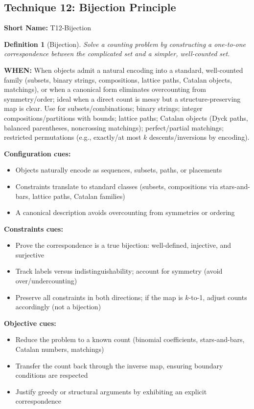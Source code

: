 \documentclass[12pt]{article}
\newtheorem{definition}{Definition}[section]
\begin{document}
\subsection{Technique 12: Bijection Principle}
\textbf{Short Name:} T12-Bijection

\begin{definition}[Bijection]
Solve a counting problem by constructing a one-to-one correspondence between the complicated set and a simpler, well-counted set.
\end{definition}

\textbf{WHEN:} When objects admit a natural encoding into a standard, well-counted family (subsets, binary strings, compositions, lattice paths, Catalan objects, matchings), or when a canonical form eliminates overcounting from symmetry/order; ideal when a direct count is messy but a structure-preserving map is clear. Use for subsets/combinations; binary strings; integer compositions/partitions with bounds; lattice paths; Catalan objects (Dyck paths, balanced parentheses, noncrossing matchings); perfect/partial matchings; restricted permutations (e.g., exactly/at most $k$ descents/inversions by encoding).

\textbf{Configuration cues:}
\begin{itemize}
    \item Objects naturally encode as sequences, subsets, paths, or placements
    \item Constraints translate to standard classes (subsets, compositions via stars-and-bars, lattice paths, Catalan families)
    \item A canonical description avoids overcounting from symmetries or ordering
\end{itemize}

\textbf{Constraints cues:}
\begin{itemize}
    \item Prove the correspondence is a true bijection: well-defined, injective, and surjective
    \item Track labels versus indistinguishability; account for symmetry (avoid over/undercounting)
    \item Preserve all constraints in both directions; if the map is $k$-to-1, adjust counts accordingly (not a bijection)
\end{itemize}

\textbf{Objective cues:}
\begin{itemize}
    \item Reduce the problem to a known count (binomial coefficients, stars-and-bars, Catalan numbers, matchings)
    \item Transfer the count back through the inverse map, ensuring boundary conditions are respected
    \item Justify greedy or structural arguments by exhibiting an explicit correspondence
\end{itemize}
\end{document}
